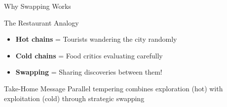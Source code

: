 \begin{frame}{Why Swapping Works}
	\begin{block}{The Restaurant Analogy}
		\begin{itemize}
			\item \textbf{Hot chains} = Tourists wandering the city randomly
			\item \textbf{Cold chains} = Food critics evaluating carefully
			\item \textbf{Swapping} = Sharing discoveries between them!
		\end{itemize}
	\end{block}

	\begin{alertblock}{Take-Home Message}
		Parallel tempering combines exploration (hot) with exploitation (cold) through strategic swapping
	\end{alertblock}

\end{frame}




